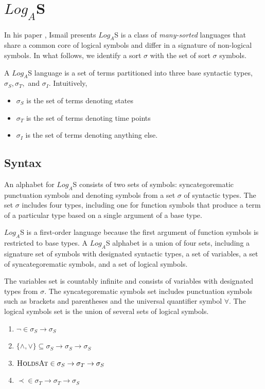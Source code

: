 \chapter{$Log_A$S}

In his paper \cite{ismail2013stability}, Ismail presents
$Log_A$S is a class of \textit{many-sorted} languages that share a common core of logical symbols and differ in a signature of non-logical symbols. In what follows, we identify a sort $\sigma$ with
the set of sort $\sigma$ symbols.

A $Log_A$S language is a set of terms partitioned into three base syntactic types, $\sigma_S , \sigma_T ,$
and $\sigma_I$. Intuitively,
\begin{itemize}
	\item $\sigma_S$ is the set of terms denoting states
	\item $\sigma_T$ is the set of terms denoting time points
	\item $\sigma_I$ is the set of terms denoting anything else.
\end{itemize}

\section{Syntax}

An alphabet for $Log_A$S consists of two sets of symbols: syncategorematic punctuation symbols and denoting symbols from a set $\sigma$ of syntactic types. The set $\sigma$ includes four types, including one for function symbols that produce a term of a particular type based on a single argument of a base type.

$Log_A$S is a first-order language because the first argument of function symbols is restricted to base types. A $Log_A$S alphabet is a union of four sets, including a signature set of symbols with designated syntactic types, a set of variables, a set of syncategorematic symbols, and a set of logical symbols.

The variables set is countably infinite and consists of variables with designated types from $\sigma$. The syncategorematic symbols set includes punctuation symbols such as brackets and parentheses and the universal quantifier symbol $\forall$. The logical symbols set is the union of several sets of logical symbols.

\begin{enumerate}
	\item $\neg \in \sigma_S \to \sigma_S$
	\item $\{\land, \lor \} \subseteq \sigma_S \to \sigma_S \to \sigma_S$
	\item $\textsc{HoldsAt} \in \sigma_S \to \sigma_T \to \sigma_S$
	\item $\prec \in \sigma_T \to \sigma_T \to \sigma_S$
\end{enumerate}

